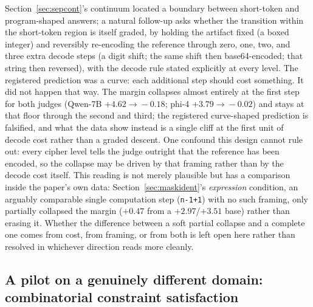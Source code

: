 \documentclass[11pt]{article}
\begin{document}
Section~\ref{sec:sepcont}'s continuum located a boundary between short-token and program-shaped answers; a natural follow-up asks whether the transition within the short-token region is itself graded, by holding the artifact fixed (a boxed integer) and reversibly re-encoding the reference through zero, one, two, and three extra decode steps (a digit shift; the same shift then base64-encoded; that string then reversed), with the decode rule stated explicitly at every level. The registered prediction was a curve: each additional step should cost something. It did not happen that way. The margin collapses almost entirely at the first step for both judges (Qwen-7B $+4.62\!\to\!-0.18$; phi-4 $+3.79\!\to\!-0.02$) and stays at that floor through the second and third; the registered curve-shaped prediction is falsified, and what the data show instead is a single cliff at the first unit of decode cost rather than a graded descent. One confound this design cannot rule out: every cipher level tells the judge outright that the reference has been encoded, so the collapse may be driven by that framing rather than by the decode cost itself. This reading is not merely plausible but has a comparison inside the paper's own data: Section~\ref{sec:maskident}'s \emph{expression} condition, an arguably comparable single computation step (\texttt{n-1+1}) with no such framing, only partially collapsed the margin ($+0.47$ from a $+2.97$/$+3.51$ base) rather than erasing it. Whether the difference between a soft partial collapse and a complete one comes from cost, from framing, or from both is left open here rather than resolved in whichever direction reads more cleanly.

\subsection{A pilot on a genuinely different domain: combinatorial constraint satisfaction}
\label{sec:appendix-mathconstraint}
\end{document}
